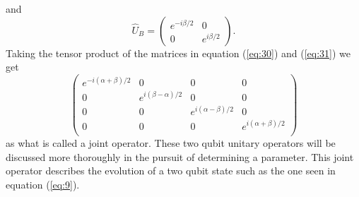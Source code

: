 \documentclass[twocolumn]{article}
\begin{document}
and
\begin{equation} \label{eq:31}
\hat{U}_B=
\begin{pmatrix}
e^{-i\beta/2} & 0 \\
0 & e^{i\beta/2}
\end{pmatrix}.
\end{equation}
Taking the tensor product of the matrices in equation (\ref{eq:30}) and (\ref{eq:31}) we get
\begin{equation} \label{eq:32}
\left(\begin{array}{cccc}
e^{-i(\alpha+\beta)/2} & 0 & 0 & 0 \\
0 & e^{i(\beta-\alpha)/2} & 0 & 0 \\
0 & 0 & e^{i(\alpha-\beta)/2} & 0 \\
0 & 0 & 0 & e^{i(\alpha+\beta)/2} \\
\end{array}\right)
\end{equation}
as what is called a joint operator. These two qubit unitary operators will be discussed more thoroughly in the pursuit of determining a parameter. This joint operator describes the evolution of a two qubit state such as the one seen in equation (\ref{eq:9}).
\end{document}
